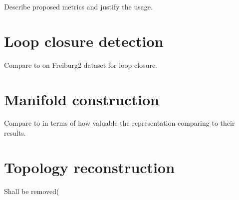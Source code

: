 Describe proposed metrics and justify the usage.

\section{Loop closure detection}

Compare to \cite{Xia2016} on Freiburg2 dataset for loop closure.

\section{Manifold construction}

Compare to \cite{Jaderberg2015} in terms of how valuable the representation comparing to their results.

\section{Topology reconstruction}

Shall be removed(
